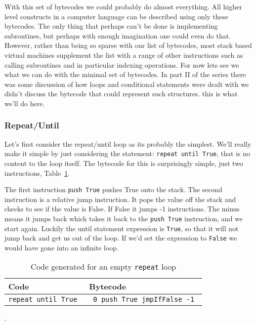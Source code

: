 With this set of bytecodes we could probably do almost everything. All higher level constructs in a computer language can be described using only these bytecodes. The only thing that perhaps can't be done is implementing subroutines, but perhaps with enough imagination one could even do that. However, rather than being so sparse with our list of bytecodes, most stack based virtual machines supplement the list with a range of other instructions such as calling subroutines and in particular indexing operations. For now lets see we what we can do with the minimal set of bytecodes. In part II of the series there was some discussion of how loops and conditional statements were dealt with we didn't discuss the bytecode that could represent such structures. this is what we'll do here.

\subsubsection*{Repeat/Until}

Let's first consider the repeat/until loop as its probably the simplest. We'll really make it simple by just considering the statement: {\tt repeat until True}, that is no content to the loop itself. The bytecode for this is surprisingly simple, just two instructions, Table~\ref{code:repeatempty}.

The first instruction {\tt push True} pushes True onto the stack. The second instruction is a relative jump instruction. It pops the value off the stack and checks to see if the value is False. If False it jumps -1 instructions. The minus means it jumps back which takes it back to the {\tt push True} instruction, and we start again. Luckily the until statement expression is {\tt True}, so that it will not jump back and get us out of the loop. If we'd set the expression to {\tt False} we would have gone into an infinite loop.


\begin{table}
\centering
\begingroup\setlength{\fboxsep}{0pt}
\colorbox{mylightgray}{%
\begin{tabular}{p{4.6cm}p{4.6cm}} \toprule
Code & Bytecode  \\ \midrule
{\tt repeat \linebreak
until True \linebreak} & {\tt
  0  push True \linebreak
  1  jmpIfFalse -1 \linebreak
}  \\ \bottomrule
\end{tabular}}\endgroup
\caption{Code generated for an empty {\tt repeat} loop}.
\label{code:repeatempty}
\end{table}


